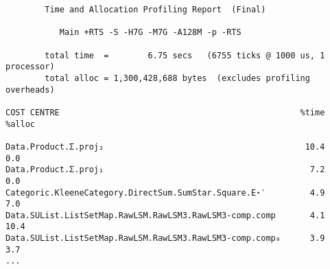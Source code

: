 \begin{verbatim}
        Time and Allocation Profiling Report  (Final)

           Main +RTS -S -H7G -M7G -A128M -p -RTS

        total time  =        6.75 secs   (6755 ticks @ 1000 us, 1 processor)
        total alloc = 1,300,428,688 bytes  (excludes profiling overheads)

COST CENTRE                                                 %time %alloc

Data.Product.Σ.proj₂                                         10.4    0.0
Data.Product.Σ.proj₁                                          7.2    0.0
Categoric.KleeneCategory.DirectSum.SumStar.Square.E⋆′         4.9    7.0
Data.SUList.ListSetMap.RawLSM.RawLSM3.RawLSM3-comp.comp       4.1   10.4
Data.SUList.ListSetMap.RawLSM.RawLSM3.RawLSM3-comp.comp₀      3.9    3.7
...
\end{verbatim}
